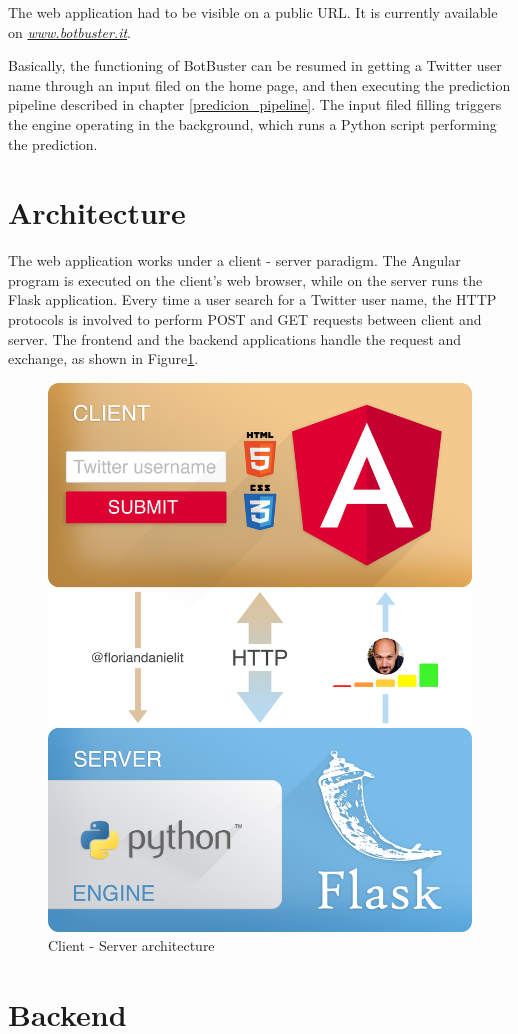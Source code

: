 The web application had to be visible on a public URL. It is currently available on \href{http://www.botbuster.it}{\textit{www.botbuster.it}}.

Basically, the functioning of BotBuster can be resumed in getting a Twitter user name through an input filed on the home page, and then executing the prediction pipeline described in chapter \ref{predicion_pipeline}.
The input filed filling triggers the engine operating in the background, which runs a Python script performing the prediction.
\section{Architecture}
The web application works under a client - server paradigm. The Angular program is executed on the client's web browser, while on the server runs the Flask application.
Every time a user search for a Twitter user name, the HTTP protocols is involved to perform POST and GET requests between client and server. The frontend and the backend applications handle the request and exchange, as shown in Figure\ref{fig:architecture}.
\begin{figure}
	\begin{center}
		\includegraphics[width=0.6\columnwidth]{chapter7/figure/architecture.png}\par 
	\end{center}
	\caption{Client - Server architecture}
	\label{fig:architecture}
\end{figure}

\section{Backend}
